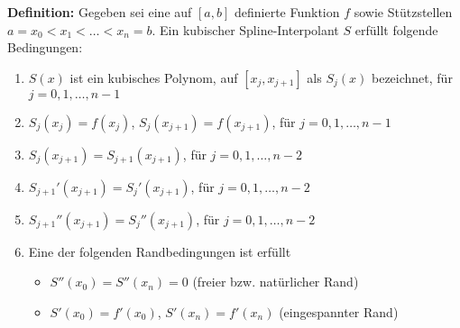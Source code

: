 \textbf{Definition:} Gegeben sei eine auf $[a,b]$ definierte Funktion $f$ sowie Stützstellen $a=x_0<x_1<\ldots<x_n = b$. Ein kubischer Spline-Interpolant $S$ erfüllt folgende Bedingungen:
\begin{enumerate}
	\item $S(x)$ ist ein kubisches Polynom, auf $[x_j,x_{j+1}]$ als $S_j(x)$ bezeichnet, für $j=0,1,\ldots,n-1$
	\item $S_j(x_j) = f(x_j)$, $S_j(x_{j+1}) = f(x_{j+1})$, für $j=0,1,\ldots,n-1$
	\item $S_j(x_{j+1}) = S_{j+1}(x_{j+1})$, für $j=0,1,\ldots,n-2$
	\item $S_{j+1}'(x_{j+1}) = S_j'(x_{j+1})$, für $j=0,1,\ldots,n-2$
	\item $S_{j+1}''(x_{j+1}) = S_j''(x_{j+1})$, für $j=0,1,\ldots,n-2$
	\item Eine der folgenden Randbedingungen ist erfüllt
	\begin{itemize}
		\item $S''(x_0) = S''(x_n) = 0$ (freier bzw. natürlicher Rand)
		\item $S'(x_0) = f'(x_0)$, $S'(x_n) = f'(x_n)$ (eingespannter Rand)
	\end{itemize}
\end{enumerate}

